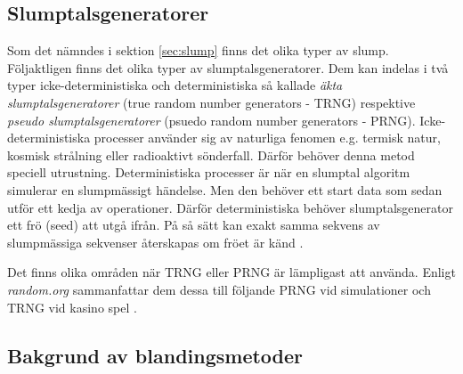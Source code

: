\documentclass[swedish,a4paper]{article}
\begin{document}
\subsection{Slumptalsgeneratorer}
\label{sec:prng}

Som det nämndes i sektion \ref{sec:slump}  finns det olika typer av slump.
Följaktligen finns det olika typer av slumptalsgeneratorer. Dem kan indelas i två
typer icke-deterministiska och deterministiska så kallade \textit{äkta
slumptalsgeneratorer} (true random number generators - TRNG) respektive 
\textit{pseudo slumptalsgeneratorer} (psuedo random number
generators - PRNG). Icke-deterministiska processer använder sig av naturliga
fenomen e.g. termisk natur, kosmisk strålning eller radioaktivt sönderfall.
Därför behöver denna metod speciell utrustning. Deterministiska processer är när en slumptal algoritm simulerar en slumpmässigt
händelse. Men den behöver ett start data som sedan utför ett kedja av
operationer. Därför deterministiska behöver slumptalsgenerator ett frö (seed) att
utgå ifrån. På så sätt kan exakt samma sekvens av slumpmässiga sekvenser
återskapas om fröet
är känd \parencite{salinhanes2011}.

Det finns olika områden när TRNG eller PRNG är lämpligast att använda.
Enligt \textit{random.org} sammanfattar dem dessa till följande PRNG vid simulationer och
TRNG vid kasino spel \parencite{randomorg}. 


%
%

\subsection{Bakgrund av blandingsmetoder}
\end{document}
